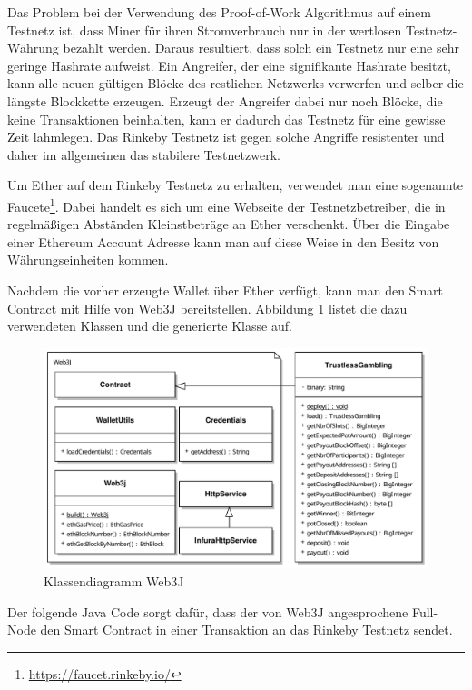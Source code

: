 Das Problem bei der Verwendung des Proof-of-Work Algorithmus auf einem Testnetz ist, dass Miner für ihren Stromverbrauch nur in der wertlosen Testnetz-Währung bezahlt werden. Daraus resultiert, dass solch ein Testnetz nur eine sehr geringe Hashrate aufweist. Ein Angreifer, der eine signifikante Hashrate besitzt, kann alle neuen gültigen Blöcke des restlichen Netzwerks verwerfen und selber die längste Blockkette erzeugen. Erzeugt der Angreifer dabei nur noch Blöcke, die keine Transaktionen beinhalten, kann er dadurch das Testnetz für eine gewisse Zeit lahmlegen. Das Rinkeby Testnetz ist gegen solche Angriffe resistenter und daher im allgemeinen das stabilere Testnetzwerk. 

Um Ether auf dem Rinkeby Testnetz zu erhalten, verwendet man eine sogenannte Faucete\footnote{\url{https://faucet.rinkeby.io/}}. Dabei handelt es sich um eine Webseite der Testnetzbetreiber, die in regelmäßigen Abständen Kleinstbeträge an Ether verschenkt. Über die Eingabe einer Ethereum Account Adresse kann man auf diese Weise in den Besitz von Währungseinheiten kommen.

Nachdem die vorher erzeugte Wallet über Ether verfügt, kann man den Smart Contract  mit Hilfe von Web3J bereitstellen. Abbildung \ref{fig:eth_web3j} listet die dazu verwendeten Klassen und die generierte  Klasse auf.

\begin{figure}[H]
\centering
\includegraphics[width=1\linewidth]{Figures/umsetzung_eth/eth_web3j}
\decoRule
\caption{Klassendiagramm Web3J}
\label{fig:eth_web3j}
\end{figure}

Der folgende Java Code sorgt dafür, dass der von Web3J angesprochene Full-Node den Smart Contract in einer Transaktion an das Rinkeby Testnetz sendet.

